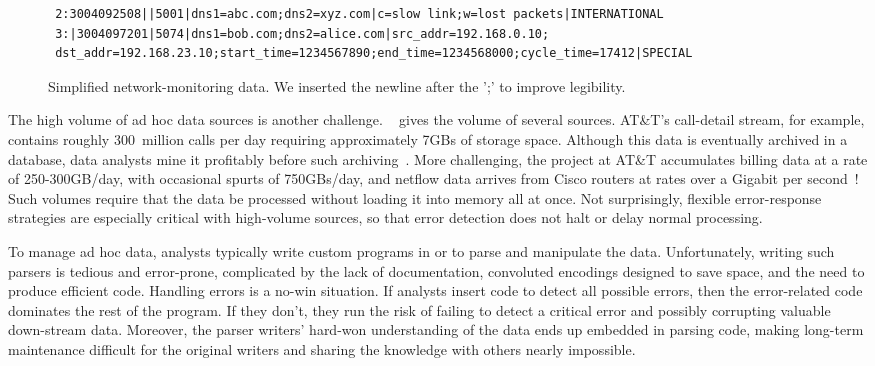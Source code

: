 \begin{figure*}
  \centering
  \small
\begin{verbatim}
 2:3004092508||5001|dns1=abc.com;dns2=xyz.com|c=slow link;w=lost packets|INTERNATIONAL
 3:|3004097201|5074|dns1=bob.com;dns2=alice.com|src_addr=192.168.0.10;
 dst_addr=192.168.23.10;start_time=1234567890;end_time=1234568000;cycle_time=17412|SPECIAL
\end{verbatim}  
  \caption{Simplified network-monitoring data. We inserted the newline
    after the ';' to improve legibility.}
  \label{fig:darkstar-records1}
\end{figure*}






The high volume of ad hoc data sources is another challenge.
~ gives the volume of several sources.
AT\&T's call-detail stream, for example, contains roughly 300~million
calls per day requiring approximately 7GBs of storage space.  Although
this data is eventually archived in a database, data analysts mine it
profitably before such archiving~\cite{kdd98,kdd99}.  More
challenging, the \ningaui{} project at AT\&T accumulates billing data
at a rate of 250-300GB/day, with occasional spurts of 750GBs/day, and
netflow data arrives from Cisco routers at rates over a Gigabit per
second~\cite{gigascope}!  Such volumes require that the data be
processed without loading it into memory all at once.  Not
surprisingly, flexible error-response strategies are especially
critical with high-volume sources, so that error detection does not
halt or delay normal processing.


To manage ad hoc data, analysts typically write custom programs in
\C{} or \perl{} to parse and manipulate the data. 
Unfortunately, writing such parsers is tedious and error-prone,
complicated by the lack of documentation, convoluted encodings
designed to save space, and the need to produce efficient code.
Handling errors is a no-win situation.  If analysts insert code
to detect all possible errors, then the error-related code dominates
the rest of the program. If they don't, they run the risk of
failing to detect a critical error and possibly corrupting valuable
down-stream data.  Moreover, the parser writers'
hard-won understanding of the data ends up embedded in parsing code,
making long-term maintenance difficult for the original writers and
sharing the knowledge with others nearly impossible.

